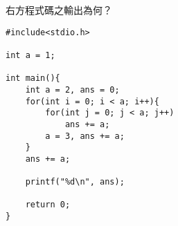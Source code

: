 \begin{TestProblem}

\begin{multicols}{2}

右方程式碼之輸出為何？


\columnbreak

\begin{lstlisting}
#include<stdio.h>

int a = 1;

int main(){
    int a = 2, ans = 0;
    for(int i = 0; i < a; i++){
        for(int j = 0; j < a; j++)
            ans += a;
        a = 3, ans += a;
    }
    ans += a;

    printf("%d\n", ans);

    return 0;
}
\end{lstlisting}

\end{multicols}

\end{TestProblem}